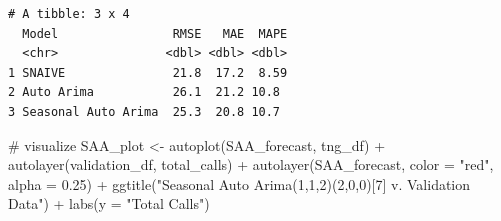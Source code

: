 \documentclass[
  letterpaper,
  DIV=11,
  numbers=noendperiod]{scrartcl}
\newenvironment{Shaded}{\begin{snugshade}}{\end{snugshade}}
\newcommand{\AttributeTok}[1]{\textcolor[rgb]{0.40,0.45,0.13}{#1}}
\newcommand{\CommentTok}[1]{\textcolor[rgb]{0.37,0.37,0.37}{#1}}
\newcommand{\FloatTok}[1]{\textcolor[rgb]{0.68,0.00,0.00}{#1}}
\newcommand{\FunctionTok}[1]{\textcolor[rgb]{0.28,0.35,0.67}{#1}}
\newcommand{\NormalTok}[1]{\textcolor[rgb]{0.00,0.23,0.31}{#1}}
\newcommand{\OtherTok}[1]{\textcolor[rgb]{0.00,0.23,0.31}{#1}}
\newcommand{\SpecialCharTok}[1]{\textcolor[rgb]{0.37,0.37,0.37}{#1}}
\newcommand{\StringTok}[1]{\textcolor[rgb]{0.13,0.47,0.30}{#1}}
\begin{document}
\begin{Shaded}
\end{Shaded}

\begin{verbatim}
# A tibble: 3 x 4
  Model                RMSE   MAE  MAPE
  <chr>               <dbl> <dbl> <dbl>
1 SNAIVE               21.8  17.2  8.59
2 Auto Arima           26.1  21.2 10.8 
3 Seasonal Auto Arima  25.3  20.8 10.7 
\end{verbatim}

\begin{Shaded}
\begin{Highlighting}[]
\CommentTok{\# visualize}
\NormalTok{SAA\_plot }\OtherTok{\textless{}{-}} \FunctionTok{autoplot}\NormalTok{(SAA\_forecast, tng\_df) }\SpecialCharTok{+} 
  \FunctionTok{autolayer}\NormalTok{(validation\_df, total\_calls) }\SpecialCharTok{+} 
  \FunctionTok{autolayer}\NormalTok{(SAA\_forecast, }\AttributeTok{color =} \StringTok{"red"}\NormalTok{, }\AttributeTok{alpha =} \FloatTok{0.25}\NormalTok{) }\SpecialCharTok{+}
  \FunctionTok{ggtitle}\NormalTok{(}\StringTok{"Seasonal Auto Arima(1,1,2)(2,0,0)[7] v. Validation Data"}\NormalTok{) }\SpecialCharTok{+} 
  \FunctionTok{labs}\NormalTok{(}\AttributeTok{y =} \StringTok{"Total Calls"}\NormalTok{)}
\end{Highlighting}
\end{Shaded}
\end{document}
